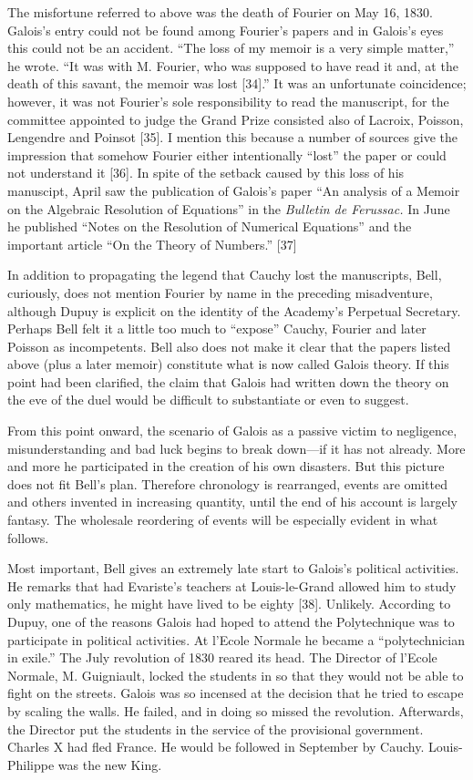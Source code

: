 \documentclass[12pt]{article}
\begin{document}
The misfortune referred to above was the death of Fourier on May 16, 1830. Galois's entry could not be found among Fourier's papers and in Galois's eyes this could not be an accident. ``The loss of my memoir is a very simple matter,'' he wrote. ``It was with M. Fourier, who was supposed to have read it and, at the death of this savant, the memoir was lost [34].'' It was an unfortunate coincidence; however, it was not Fourier's sole responsibility to read the manuscript, for the committee appointed to judge the Grand Prize consisted also of Lacroix, Poisson, Lengendre and Poinsot [35]. I mention this because a number of sources give the impression that somehow Fourier either intentionally ``lost'' the paper or could not understand it [36]. In spite of the setback caused by this loss of his manuscipt, April saw the publication of Galois's paper ``An analysis of a Memoir on the Algebraic Resolution of Equations'' in the \emph{Bulletin de Ferussac.} In June he published ``Notes on the Resolution of Numerical Equations'' and the important article ``On the Theory of Numbers.'' [37]

In addition to propagating the legend that Cauchy lost the manuscripts, Bell, curiously, does not mention Fourier by name in the preceding misadventure, although Dupuy is explicit on the identity of the Academy's Perpetual Secretary. Perhaps Bell felt it a little too much to ``expose'' Cauchy, Fourier and later Poisson as incompetents. Bell also does not make it clear that the papers listed above (plus a later memoir) constitute what is now called Galois theory. If this point had been clarified, the claim that Galois had written down the theory on the eve of the duel would be difficult to substantiate or even to suggest.

From this point onward, the scenario of Galois as a passive victim to negligence, misunderstanding and bad luck begins to break down---if it has not already. More and more he participated in the creation of his own disasters. But this picture does not fit Bell's plan. Therefore chronology is rearranged, events are omitted and others invented in increasing quantity, until the end of his account is largely fantasy. The wholesale reordering of events will be especially evident in what follows.

Most important, Bell gives an extremely late start to Galois's political activities. He remarks that had Evariste's teachers at Louis-le-Grand allowed him to study only mathematics, he might have lived to be eighty [38]. Unlikely. According to Dupuy, one of the reasons Galois had hoped to attend the Polytechnique was to participate in political activities. At l'Ecole Normale he became a ``polytechnician in exile.'' The July revolution of 1830 reared its head. The Director of l'Ecole Normale, M. Guigniault, locked the students in so that they would not be able to fight on the streets. Galois was so incensed at the decision that he tried to escape by scaling the walls. He failed, and in doing so missed the revolution. Afterwards, the Director put the students in the service of the provisional government. Charles X had fled France. He would be followed in September by Cauchy. Louis-Philippe was the new King.
\end{document}
